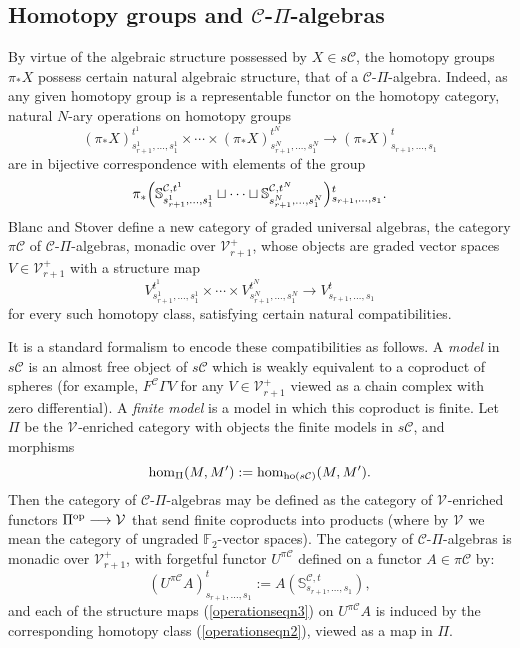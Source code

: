 \documentclass[11pt]{amsart} \renewcommand{\baselinestretch}{1.2}
\theoremstyle{plain}
\numberwithin{equation}{section} %
\theoremstyle{plain}
\numberwithin{equation}{chapter} %
\renewcommand{\to}{\longrightarrow}
\newcommand{\calV}{\mathcal{V}}
\newcommand{\calc}{\mathcal{C}}
\newcommand{\vect}[2]{\calV^{#1}_{#2}}
\newcommand{\PA}[1]{\pi#1}
\newcommand{\F}{\mathbb{F}}
\newcommand{\Ftwo}{\F_2}
\newcommand{\SubsectionOrSection}[1]{\subsection{#1}}
\begin{document}
\begin{Pi-algebras and cohomology algebras}
\SubsectionOrSection{Homotopy groups and $\calc$-$\Pi$-algebras}\label{homotopy and pialgs}
By virtue of the algebraic structure possessed by $X\in s\calc$, the homotopy groups $\pi_*X$ possess certain natural algebraic structure, that of a $\calc$-$\Pi$-algebra. Indeed, as any given homotopy group is a representable functor on the homotopy category, natural $N$-ary operations on homotopy groups
\begin{equation}\label{operationseqn1}
(\pi_*X)_{s_{r+1}^{1},\ldots,s_{1}^{1}}^{t^1}\times\cdots \times(\pi_*X)_{s_{r+1}^{N},\ldots,s_{1}^{N}}^{t^N}\to (\pi_*X)_{s_{r+1},\ldots,s_{1}}^{t}\end{equation}
are in bijective correspondence with elements of the group
\begin{equation}\label{operationseqn2}
 \pi_*\Bigl(\mathbb{S}^{\calc,t^1}_{s_{r+1}^{1},\ldots,s_{1}^{1}}\sqcup\cdots\sqcup \mathbb{S}^{\calc,t^N}_{s_{r+1}^{N},\ldots,s_{1}^{N}}\Bigr)\makebox[0cm][l]{}_{s_{r+1},\ldots,s_{1}}^{t}.\end{equation}
Blanc and Stover \cite{Blanc_Stover-Groth_SS.pdf} define a new category of graded universal algebras, the category $\PA{\calc}$ of $\calc$-$\Pi$-algebras, monadic over $\vect{+}{r+1}$, whose objects are graded vector spaces $V\in\vect{+}{r+1}$ with a structure map 
\begin{equation}\label{operationseqn3}
V_{s_{r+1}^{1},\ldots,s_{1}^{1}}^{t^1}\times\cdots \times V_{s_{r+1}^{N},\ldots,s_{1}^{N}}^{t^N}\to V_{s_{r+1},\ldots,s_{1}}^{t}\end{equation}
for every such homotopy class, satisfying certain natural compatibilities.

It is a standard formalism to encode these compatibilities as follows. A \emph{model}  \cite{Blanc_Stover-Groth_SS.pdf} in $s\calc$ is 
an almost free object of $s\calc$ which is weakly equivalent to a coproduct of spheres (for example, $F^{\calc}\Gamma V$ for any $V\in\vect{+}{r+1}$ viewed as a chain complex with zero differential). A \emph{finite model} is a model in which this coproduct is finite. Let $\Pi$  be the $\vect{}{}$-enriched category with objects the finite models in $s\calc$, and morphisms
\[\hom_{\Pi}(M,M'):=\hom_{\textup{ho}(s\calc)}(M,M').\]
Then the category of $\calc$-$\Pi$-algebras  may be defined as the category of $\vect{}{}$-enriched functors $\Pi^\textup{op}\to \vect{}{}$ that send finite coproducts into products (where by $\vect{}{}$ we mean the category of ungraded $\Ftwo $-vector spaces). The category of $\calc$-$\Pi$-algebras is monadic over $\vect{+}{r+1}$, with  forgetful functor $U^{\PA{\calc}}$ defined on a functor $A\in \PA{\calc}$ by:%
\[(U^{\PA{\calc}}A)^t_{s_{r+1},\ldots,s_1}:=A(\mathbb{S}^{\calc,t}_{s_{r+1},\ldots,s_{1}}),\]
and each of the structure maps (\ref{operationseqn3}) on $U^{\PA{\calc}}A$ is induced by the corresponding homotopy class (\ref{operationseqn2}), viewed as a map in $\Pi$. %


\end{Pi-algebras and cohomology algebras}
\end{document}
